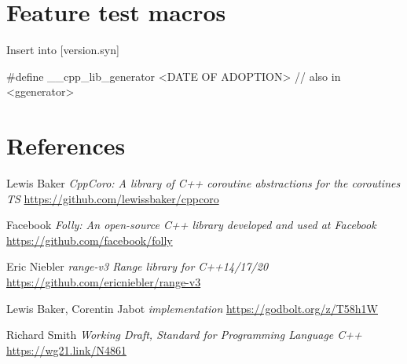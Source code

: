 \documentclass{wg21}
\begin{document}
\section{Feature test macros}

Insert into [version.syn]

\begin{addedblock}
\begin{codeblock}
    #define __cpp_lib_generator <DATE OF ADOPTION> // also in <ggenerator>
\end{codeblock}
\end{addedblock}


\section{References}
\renewcommand{\section}[2]{}%



\begin{thebibliography}{9}
    Lewis Baker
    \emph{CppCoro: A library of C++ coroutine abstractions for the coroutines TS}\newline
    \url{https://github.com/lewissbaker/cppcoro}

    Facebook
    \emph{Folly: An open-source C++ library developed and used at Facebook}\newline
    \url{https://github.com/facebook/folly}


    Eric Niebler
    \emph{range-v3 Range library for C++14/17/20}\newline
    \url{https://github.com/ericniebler/range-v3}

    Lewis Baker, Corentin Jabot
    \emph{ implementation}\newline
    \url{https://godbolt.org/z/T58h1W}

    Richard Smith
    \emph{Working Draft, Standard for Programming Language C++}\newline
    \url{https://wg21.link/N4861}


\end{thebibliography}
\end{document}
